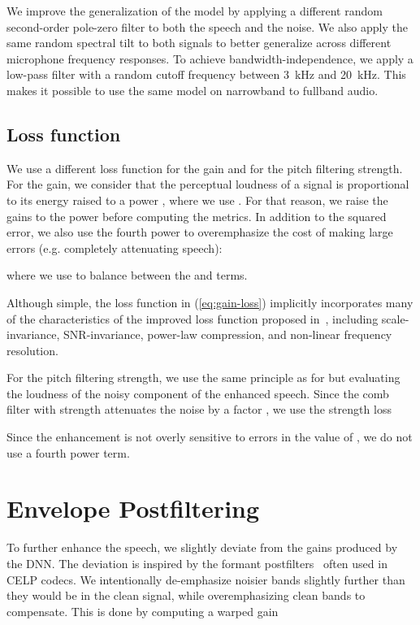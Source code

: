 \documentclass[english]{article}
\begin{document}
We improve the generalization of the model by applying a different
random second-order pole-zero filter to both the speech and the noise.
We also apply the same random spectral tilt to both signals to better
generalize across different microphone frequency responses. To achieve
bandwidth-independence, we apply a low-pass filter with a random cutoff
frequency between 3~kHz and 20~kHz. This makes it possible to use
the same model on narrowband to fullband audio. 


\subsection{Loss function}

We use a different loss function for the gain and for the pitch filtering
strength. For the gain, we consider that the perceptual loudness of
a signal is proportional to its energy raised to a power ,
where we use . For that reason, we raise the gains to
the power  before computing the metrics. In addition to the
squared error, we also use the fourth power to overemphasize the cost
of making large errors (e.g. completely attenuating speech):

where we use  to balance between the  and 
terms.

Although simple, the loss function in (\ref{eq:gain-loss}) implicitly
incorporates many of the characteristics of the improved loss function
proposed in~\cite{erdogan2018investigations}, including scale-invariance,
SNR-invariance, power-law compression, and non-linear frequency resolution.

For the pitch filtering strength, we use the same principle as for
 but evaluating the loudness of the noisy component
of the enhanced speech. Since the comb filter with strength 
attenuates the noise by a factor , we use the
strength loss

Since the enhancement is not overly sensitive to errors in the value
of , we do not use a fourth power term.


\section{Envelope Postfiltering}

\label{sec:post-filtering}

To further enhance the speech, we slightly deviate from the gains
 produced by the DNN. The deviation is inspired by the
formant postfilters~\cite{chen1995adaptive} often used in CELP codecs.
We intentionally de-emphasize noisier bands slightly further than
they would be in the clean signal, while overemphasizing clean bands
to compensate. This is done by computing a warped gain
\end{document}
